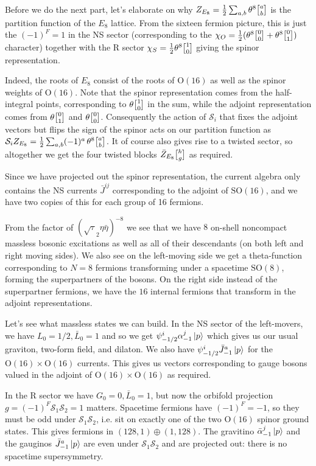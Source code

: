 \documentclass[11pt, class=article, crop=false]{standalone}
\begin{document}
\begin{enumerate}
	Before we do the next part, let's elaborate on why $Z_{E_8} = \frac12 \sum_{a, b} \theta^8 \twist ab$ is the partition function of the $E_8$ lattice. From the sixteen fermion picture, this is just the $(-1)^F = 1$ in the NS sector (corresponding to the $\chi_O = \frac12 (\theta^8 \twist00 + \theta^8 \twist01)$ character) together with the R sector $\chi_S = \frac12 \theta^8 \twist10$ giving the spinor representation.
	 
	Indeed, the roots of $E_8$ consist of the roots of $\mathrm O(16)$ as well as the spinor weights of $\mathrm O(16)$. Note that the spinor representation comes from the half-integral points, corresponding to $\theta \twist10$ in the sum, while the adjoint representation comes from $\theta \twist 01$ and $\theta \twist 00$. Consequently the action of $\mathcal S_i$ that fixes the adjoint vectors but flips the sign of the spinor acts on our partition function as $\mathcal S_i Z_{E_8} = \frac12 \sum_{a, b} (-1)^{a}\, \theta^8 \twist ab$. It of course also gives rise to a twisted sector, so altogether we get the four twisted blocks $\bar Z_{E_8} \twist hg$ as required.
	
	Since we have projected out the spinor representation, the current algebra only contains the NS currents $\bar J^{ij}$ corresponding to the adjoint of $\mathrm{SO}(16)$, and we have two copies of this for each group of 16 fermions. 
	
	From the factor of $(\sqrt \tau_2 \eta \bar \eta)^{-8}$ we see that we have $8$ on-shell noncompact massless bosonic excitations as well as all of their descendants (on both left and right moving sides). We also see on the left-moving side we get a theta-function corresponding to $N=8$ fermions transforming under a spacetime $\mathrm{SO}(8)$, forming the superpartners of the bosons. On the right side instead of the superpartner fermions, we have the $16$ internal fermions that transform in the adjoint representations. 
	
	Let's see what massless states we can build. In the NS sector of the left-movers, we have $L_0 = 1/2, \bar L_0 = 1$ and so we get $\psi^i_{-1/2} \alpha^j_{-1} \ket p$ which gives us our usual graviton, two-form field, and dilaton. We also have $\psi^i_{-1/2} \bar J^a_{-1} \ket{p}$ for the $\mathrm{O}(16) \times \mathrm{O}(16)$ currents. This gives us vectors corresponding to gauge bosons valued in the adjoint of $\mathrm{O}(16) \times \mathrm{O}(16)$ as required. 
	
	In the R sector we have $G_0 = 0, \bar L_0 = 1$, but now the orbifold projection $g = (-1)^F \mathcal S_1 \mathcal S_2 = 1$ matters. Spacetime fermions have $(-1)^F = -1$, so they must be odd under $\mathcal S_1 \mathcal S_2$, i.e. sit on exactly one of the two $\mathrm{O}(16)$ spinor ground states. This gives fermions in $(128, 1) \oplus (1, 128)$. The gravitino $\bar \alpha^j_{-1} \ket p$ and the gauginos $\bar J^a_{-1} \ket p$ are even under $\mathcal S_1 \mathcal S_2$ and are projected out: there is no spacetime supersymmetry.
	

\end{enumerate}
\end{document}

